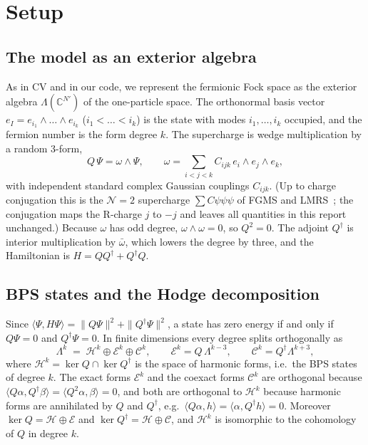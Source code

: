 \documentclass[11pt]{article}
\newcommand{\Np}{N'}
\newcommand{\ip}[2]{\langle #1,#2\rangle}
\newcommand{\Hc}{\mathcal H}
\newcommand{\Ec}{\mathcal E}
\newcommand{\Cc}{\mathcal C}
\theoremstyle{plain}
\theoremstyle{remark}
\numberwithin{equation}{section}
\begin{document}
\section{Setup}\label{sec:setup}

\subsection{The model as an exterior algebra}

As in CV and in our code, we represent the fermionic Fock space as the exterior algebra $\Lambda(\mathbb C^{\Np})$ of
the one-particle space. The orthonormal basis vector $e_I=e_{i_1}\wedge\dots\wedge e_{i_k}$ ($i_1<\dots<i_k$) is the state
with modes $i_1,\dots,i_k$ occupied, and the fermion number is the form degree $k$. The supercharge is wedge
multiplication by a random 3-form,
\begin{equation}\label{eq:Q}
Q\,\Psi=\omega\wedge\Psi,\qquad \omega=\sum_{i<j<k}C_{ijk}\,e_i\wedge e_j\wedge e_k ,
\end{equation}
with independent standard complex Gaussian couplings $C_{ijk}$. (Up to charge conjugation this is the
$\mathcal N=2$ supercharge $\sum C\psi\psi\psi$ of FGMS and LMRS~\cite{FGMS,LMRS}; the conjugation maps the R-charge $j$ to
$-j$ and leaves all quantities in this report unchanged.) Because $\omega$ has odd degree, $\omega\wedge\omega=0$, so
$Q^2=0$. The adjoint $Q^\dagger$ is interior multiplication by $\bar\omega$, which lowers the degree by three, and the
Hamiltonian is $H=QQ^\dagger+Q^\dagger Q$.

\subsection{BPS states and the Hodge decomposition}

Since $\ip{\Psi}{H\Psi}=\|Q\Psi\|^2+\|Q^\dagger\Psi\|^2$, a state has zero energy if and only if $Q\Psi=0$ and
$Q^\dagger\Psi=0$. In finite dimensions every degree splits orthogonally as
\begin{equation}\label{eq:hodge}
\Lambda^k \;=\; \Hc^k\oplus\Ec^k\oplus\Cc^k,\qquad
\Ec^k=Q\,\Lambda^{k-3},\qquad \Cc^k=Q^\dagger\Lambda^{k+3},
\end{equation}
where $\Hc^k=\ker Q\cap\ker Q^\dagger$ is the space of harmonic forms, i.e.\ the BPS states of degree $k$. The exact
forms $\Ec^k$ and the coexact forms $\Cc^k$ are orthogonal because $\ip{Q\alpha}{Q^\dagger\beta}=\ip{Q^2\alpha}{\beta}=0$,
and both are orthogonal to $\Hc^k$ because harmonic forms are annihilated by $Q$ and $Q^\dagger$, e.g.\
$\ip{Q\alpha}{h}=\ip{\alpha}{Q^\dagger h}=0$. Moreover $\ker Q=\Hc\oplus\Ec$ and $\ker Q^\dagger=\Hc\oplus\Cc$,
and $\Hc^k$ is isomorphic to the cohomology of $Q$ in degree $k$.
\end{document}
